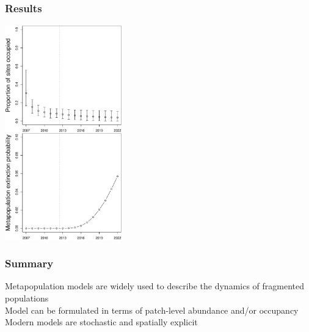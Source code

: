 \documentclass[color=usenames,dvipsnames]{beamer}\usepackage[]{graphicx}\usepackage[]{color}
\begin{document}
\begin{frame}
  \frametitle{Results}
  \begin{center}
    \includegraphics[width=0.38\textwidth]{figs/proj-ext2} \\
  \end{center}
\end{frame}




\begin{frame}
  \frametitle{Summary}
  \large
  Metapopulation models are widely used to describe the
      dynamics of fragmented populations \\
  \vfill
  Model can be formulated in terms of patch-level abundance
      and/or occupancy \\
  \vfill
  Modern models are stochastic and spatially explicit
\end{frame}
\end{document}

